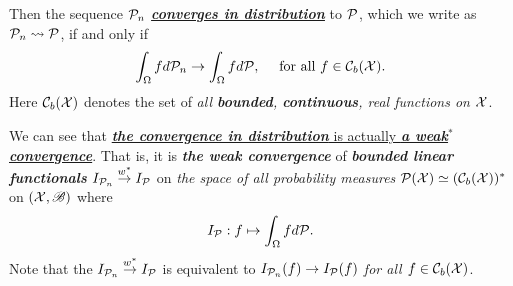 \documentclass[11pt]{article}
\begin{document}
\begin{itemize}
\begin{definition}
Then the sequence ${\mathcal P}_n$ \underline{\emph{\textbf{converges in distribution}}} to ${\mathcal P}$, which we write as ${\mathcal P}_n \rightsquigarrow {\mathcal P}$, if and only if
\begin{align*}
\int_{\Omega} f d{\mathcal P}_n \rightarrow \int_{\Omega} f d{\mathcal P}, \quad \text{ for all } f \in {\mathcal C}_{b}({\mathcal X}).
\end{align*}
Here ${\mathcal C}_{b}({\mathcal X})$ denotes the set of \emph{all \textbf{bounded}, \textbf{continuous}, real functions on ${\mathcal X}$}.
\end{definition} 
We can see that \underline{\emph{\textbf{the convergence in distribution}} is actually \emph{\textbf{a weak$^{*}$ convergence}}}. That is, it is \emph{\textbf{the weak convergence}} of  \emph{\textbf{bounded linear functionals}} $I_{{\mathcal P}_n} \stackrel{w^{*}}{\rightarrow} I_{{\mathcal P}}$ on \emph{the space of all probability measures} ${\mathcal P}({\mathcal X}) \simeq ({\mathcal C}_{b}({\mathcal X}))^{*}$ on $({\mathcal X}, {\mathscr B})$ where 
\begin{align*}
I_{{\mathcal P}}: f \mapsto \int_{\Omega} f d{\mathcal P}.
\end{align*} Note that the $I_{{\mathcal P}_n} \stackrel{w^{*}}{\rightarrow} I_{{\mathcal P}}$ is equivalent to $I_{{\mathcal P}_n}(f) \rightarrow I_{{\mathcal P}}(f)$ \emph{for all $f \in  {\mathcal C}_{b}({\mathcal X})$}.


\end{itemize}
\end{document}
